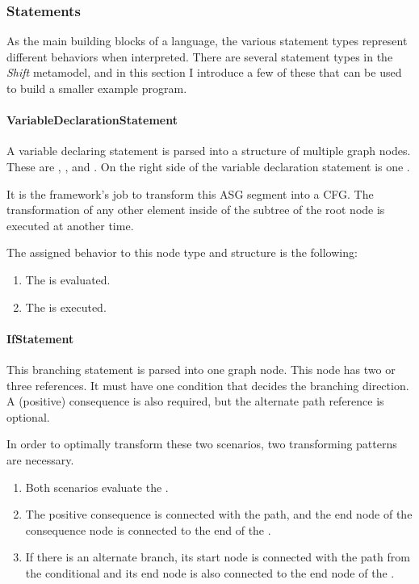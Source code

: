 \subsubsection{Statements}
As the main building blocks of a language, the various statement types represent different behaviors when interpreted. There are several statement types in the \emph{Shift} metamodel, and in this section I introduce a few of these that can be used to build a smaller example program.

\paragraph{VariableDeclarationStatement}
A variable declaring statement is parsed into a structure of multiple graph nodes. These are , , and . On the right side of the variable declaration statement is one .

It is the framework's job to transform this ASG segment into a CFG. The transformation of any other element inside of the subtree of the root  node is executed at another time.

The assigned behavior to this node type and structure is the following:
\begin{enumerate}[topsep=0pt]
	\item The  is evaluated.
	\item The  is executed.
\end{enumerate}


\paragraph{IfStatement}
This branching statement is parsed into one graph node. This node has two or three references. It must have one condition that decides the branching direction. A (positive) consequence is also required, but the alternate path reference is optional.

In order to optimally transform these two scenarios, two transforming patterns are necessary.
\begin{enumerate}[topsep=0pt]
	\item Both scenarios evaluate the .
	\item The positive consequence is connected with the  path, and the end node of the consequence node is connected to the end of the .
	\item If there is an alternate branch, its start node is connected with the  path from the conditional  and its end node is also connected to the end node of the .
\end{enumerate}

